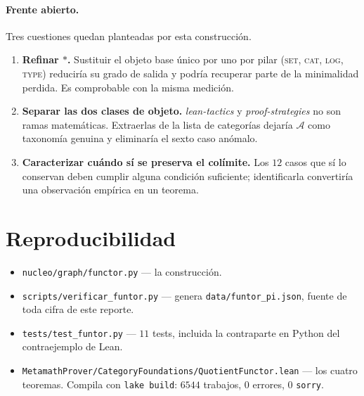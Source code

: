 \documentclass[11pt,a4paper]{article}
\theoremstyle{plain}
\theoremstyle{definition}
\theoremstyle{remark}
\newcommand{\Agentes}{\mathcal{A}}
\newcommand{\base}{\ast}
\begin{document}
\paragraph{Frente abierto.}
Tres cuestiones quedan planteadas por esta construcción.

\begin{enumerate}
\item \textbf{Refinar $\base$.} Sustituir el objeto base único por uno por
pilar (\textsc{set}, \textsc{cat}, \textsc{log}, \textsc{type}) reduciría su
grado de salida y podría recuperar parte de la minimalidad perdida. Es
comprobable con la misma medición.

\item \textbf{Separar las dos clases de objeto.} \textit{lean-tactics} y
\textit{proof-strategies} no son ramas matemáticas. Extraerlas de la lista de
categorías dejaría $\Agentes$ como taxonomía genuina y eliminaría el sexto caso
anómalo.

\item \textbf{Caracterizar cuándo sí se preserva el colímite.} Los $12$ casos
que sí lo conservan deben cumplir alguna condición suficiente; identificarla
convertiría una observación empírica en un teorema.
\end{enumerate}

\section*{Reproducibilidad}

\begin{itemize}
\item \texttt{nucleo/graph/functor.py} — la construcción.
\item \texttt{scripts/verificar\_funtor.py} — genera
      \texttt{data/funtor\_pi.json}, fuente de toda cifra de este reporte.
\item \texttt{tests/test\_funtor.py} — $11$ tests, incluida la contraparte en
      Python del contraejemplo de Lean.
\item \texttt{MetamathProver/CategoryFoundations/QuotientFunctor.lean} — los
      cuatro teoremas. Compila con \texttt{lake build}: $6544$ trabajos,
      $0$ errores, $0$ \texttt{sorry}.
\end{itemize}
\end{document}
